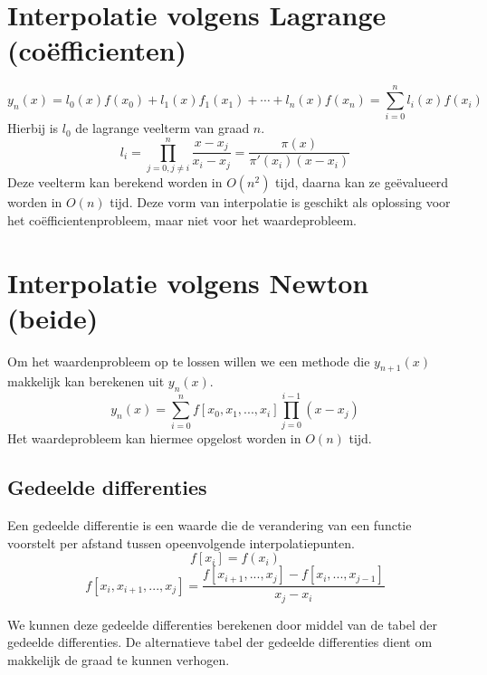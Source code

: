 \documentclass[samenvatting.tex]{subfiles}
\begin{document}
\section{Interpolatie volgens Lagrange (co\"efficienten)}
\[
y_n(x)
= l_0(x)f(x_0) + l_1(x)f_1(x_1) + \cdots + l_n(x)f(x_n)
= \sum_{i=0}^{n}l_i(x)f(x_i)
\]
Hierbij is $l_0$ de lagrange veelterm van graad $n$.
\[
l_{i} = \prod_{j=0,j\neq i}^{n}\frac{x-x_j}{x_i-x_j} = \frac{\pi(x)}{\pi'(x_i)(x-x_i)}
\]
Deze veelterm kan berekend worden in $O(n^2)$ tijd, daarna kan ze ge\"evalueerd worden in $O(n)$ tijd.
Deze vorm van interpolatie is geschikt als oplossing voor het co\"efficientenprobleem, maar niet voor het waardeprobleem.

\section{Interpolatie volgens Newton (beide)}
Om het waardenprobleem op te lossen willen we een methode die $y_{n+1}(x)$ makkelijk kan berekenen uit $y_n(x)$.
\[
y_n(x) = \sum_{i=0}^{n} f[x_0,x_1,...,x_i] \prod_{j=0}^{i-1}(x-x_j)
\]
Het waardeprobleem kan hiermee opgelost worden in $O(n)$ tijd.

\subsection{Gedeelde differenties}
\begin{defi}
Een gedeelde differentie is een waarde die de verandering van een functie voorstelt per afstand tussen opeenvolgende interpolatiepunten.
\[
f[x_i] = f(x_i)
\]
\[
f[x_i,x_{i+1},...,x_{j}] = \frac{f[x_{i+1},...,x_j] - f[x_i,...,x_{j-1}]}{x_j-x_i}
\]
\end{defi}
We kunnen deze gedeelde differenties berekenen door middel van de tabel der gedeelde differenties. De alternatieve tabel der gedeelde differenties dient om makkelijk de graad te kunnen verhogen.
\end{document}
